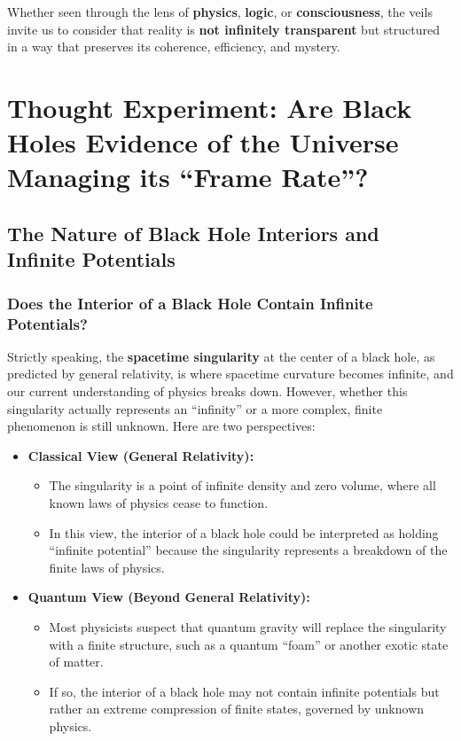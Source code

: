 \documentclass[12pt]{article}
\begin{document}
Whether seen through the lens of \textbf{physics}, \textbf{logic}, or \textbf{consciousness}, the veils invite us to consider that reality is \textbf{not infinitely transparent} but structured in a way that preserves its coherence, efficiency, and mystery.

\section{Thought Experiment: Are Black Holes Evidence of the Universe Managing its ``Frame Rate''?}

\subsection{The Nature of Black Hole Interiors and Infinite Potentials}

\subsubsection{Does the Interior of a Black Hole Contain Infinite Potentials?}

Strictly speaking, the \textbf{spacetime singularity} at the center of a black hole, as predicted by general relativity, is where spacetime curvature becomes infinite, and our current understanding of physics breaks down. However, whether this singularity actually represents an ``infinity'' or a more complex, finite phenomenon is still unknown. Here are two perspectives:

\begin{itemize}
    \item \textbf{Classical View (General Relativity):}
    \begin{itemize}
        \item The singularity is a point of infinite density and zero volume, where all known laws of physics cease to function.
        \item In this view, the interior of a black hole could be interpreted as holding ``infinite potential'' because the singularity represents a breakdown of the finite laws of physics.
    \end{itemize}
    
    \item \textbf{Quantum View (Beyond General Relativity):}
    \begin{itemize}
        \item Most physicists suspect that quantum gravity will replace the singularity with a finite structure, such as a quantum ``foam'' or another exotic state of matter.
        \item If so, the interior of a black hole may not contain infinite potentials but rather an extreme compression of finite states, governed by unknown physics.
    \end{itemize}
\end{itemize}
\end{document}
